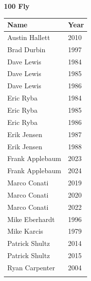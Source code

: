 \begin{minipage}[t]{0.48\textwidth}
\centering
\textbf{\textcolor{teamprimary}{100 Fly}}\par
\vspace{0.5em}
\centering
\small
\renewcommand{\arraystretch}{1.0}
\setlength{\tabcolsep}{4pt}
\begin{tabular}{@{}p{3.0cm}p{1.0cm}@{}}
\toprule
\textbf{Name} & \textbf{Year} \\
\midrule
Austin Hallett & 2010 \\
Brad Durbin & 1997 \\
Dave Lewis & 1984 \\
Dave Lewis & 1985 \\
Dave Lewis & 1986 \\
Eric Ryba & 1984 \\
Eric Ryba & 1985 \\
Eric Ryba & 1986 \\
Erik Jensen & 1987 \\
Erik Jensen & 1988 \\
Frank Applebaum & 2023 \\
Frank Applebaum & 2024 \\
Marco Conati & 2019 \\
Marco Conati & 2020 \\
Marco Conati & 2022 \\
Mike Eberhardt & 1996 \\
Mike Karcis & 1979 \\
Patrick Shultz & 2014 \\
Patrick Shultz & 2015 \\
Ryan Carpenter & 2004 \\
\bottomrule
\vspace{0.5em}
\end{tabular}
\end{minipage}
\vspace{1.2em}
